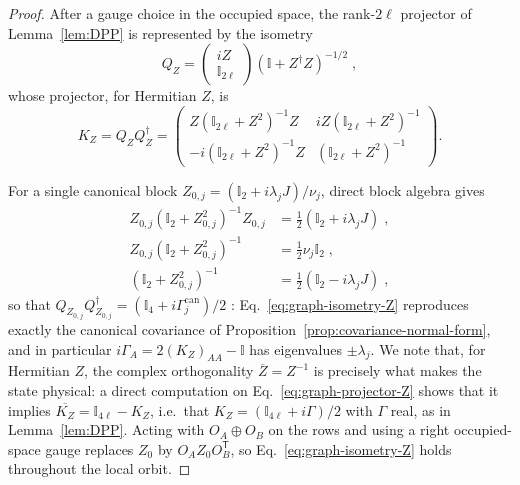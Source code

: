 \documentclass[prx,twocolumn,superscriptaddress,aps,10pt, frontmatterverbose, reprint,footinbib,longbibliography=true]{revtex4-2}
\newcommand{\trans}{\mathsf{T}}
\begin{document}
\begin{proof}
After a gauge choice in the occupied space, the rank-$2\ell$ projector of Lemma~\ref{lem:DPP} is represented by the isometry
\begin{equation}
    Q_Z=\begin{pmatrix}iZ\\ \mathbb{I}_{2\ell}\end{pmatrix}\left(\mathbb{I}+Z^\dagger Z\right)^{-1/2}\;,
    \label{eq:graph-isometry-Z}
\end{equation}
whose projector, for Hermitian $Z$, is
\begin{equation}
    K_Z=Q_ZQ_Z^\dagger=\begin{pmatrix} Z(\mathbb{I}_{2\ell}+Z^2)^{-1}Z& iZ(\mathbb{I}_{2\ell}+Z^2)^{-1}\\[2pt] -i(\mathbb{I}_{2\ell}+Z^2)^{-1}Z&(\mathbb{I}_{2\ell}+Z^2)^{-1}\end{pmatrix}.
    \label{eq:graph-projector-Z}
\end{equation}


For a single canonical block $Z_{0,j}=(\mathbb{I}_2+i\lambda_jJ)/\nu_j$, direct block algebra gives
\begin{equation}
\begin{split}
    Z_{0,j}(\mathbb{I}_2+Z_{0,j}^2)^{-1}Z_{0,j}&=\tfrac12(\mathbb{I}_2+i\lambda_jJ)\;,\\
    Z_{0,j}(\mathbb{I}_2+Z_{0,j}^2)^{-1}&=\tfrac12\nu_j\mathbb{I}_2\;,\\
    (\mathbb{I}_2+Z_{0,j}^2)^{-1}&=\tfrac12(\mathbb{I}_2-i\lambda_jJ)\;,
    \end{split}
\end{equation}
so that $Q_{Z_{0,j}}Q_{Z_{0,j}}^\dagger=(\mathbb{I}_4+i\Gamma^{\mathrm{can}}_j)/2$ : Eq.~\eqref{eq:graph-isometry-Z} reproduces exactly the canonical covariance of Proposition~\ref{prop:covariance-normal-form}, and in particular $i\Gamma_A=2(K_Z)_{AA}-\mathbb{I}$ has eigenvalues $\pm\lambda_j$. We note that, for Hermitian $Z$, the complex orthogonality $\overline{Z}=Z^{-1}$ is precisely what makes the state physical: a direct computation on Eq.~\eqref{eq:graph-projector-Z} shows that it implies $\overline{K_Z}=\mathbb{I}_{4\ell}-K_Z$, i.e.\ that $K_Z=(\mathbb{I}_{4\ell}+i\Gamma)/2$ with $\Gamma$ real, as in Lemma~\ref{lem:DPP}. Acting with $O_A\oplus O_B$ on the rows and using a right occupied-space gauge replaces $Z_0$ by $O_AZ_0O_B^{\trans}$, so Eq.~\eqref{eq:graph-isometry-Z} holds throughout the local orbit.


\end{proof}
\end{document}
